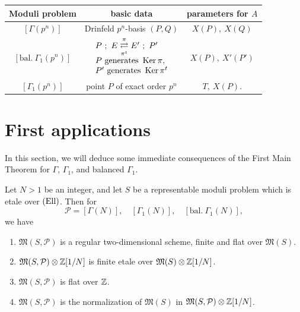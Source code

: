 \begin{center}
\begin{tabular}{@{}c|c|c@{}}
\hline
Moduli problem & basic data & parameters for $A$ \\
\hline
$[\Gamma(p^n)]$ & Drinfeld $p^n$-basis $(P, Q)$ & $X(P),\ X(Q)$ \\
\hline
$[\mathrm{bal.}\ \Gamma_1(p^n)]$ & $\begin{array}{@{}l@{}} P\ ;\ E \overset{\pi}{\underset{\pi^t}{\rightleftarrows}} E'\ ;\ P' \\[2pt] P \text{ generates } \Ker \pi, \\ P' \text{ generates } \Ker \pi^t \end{array}$ & $X(P),\ X'(P')$ \\
\hline
$[\Gamma_1(p^n)]$ & point $P$ of exact order $p^n$ & $T,\ X(P)$. \\
\hline
\end{tabular}
\end{center}

\section{First applications}
\label{sec:5.5}

In this section, we will deduce some immediate consequences of the First Main Theorem for $\Gamma$, $\Gamma_1$, and balanced $\Gamma_1$.

\begin{kthm}\label{thm:5.5.1}
Let $N > 1$ be an integer, and let $S$ be a representable moduli problem which is etale over $(\mathrm{Ell})$. Then for
\[
\mathcal{P} = [\Gamma(N)],\quad [\Gamma_1(N)],\quad [\mathrm{bal.}\ \Gamma_1(N)],
\]
we have
\begin{enumerate}[(1)]
\item $\mathfrak{M}(S, \mathcal{P})$ is a regular two-dimensional scheme, finite and flat over $\mathfrak{M}(S)$.
\item $\mathfrak{M}(S, \mathcal{P})\otimes\mathbb{Z}[1/N]$ is finite etale over $\mathfrak{M}(S)\otimes\mathbb{Z}[1/N]$.
\item $\mathfrak{M}(S, \mathcal{P})$ is flat over $\mathbb{Z}$.
\item $\mathfrak{M}(S, \mathcal{P})$ is the normalization of $\mathfrak{M}(S)$ in $\mathfrak{M}(S, \mathcal{P})\otimes\mathbb{Z}[1/N]$.
\end{enumerate}
\end{kthm}

